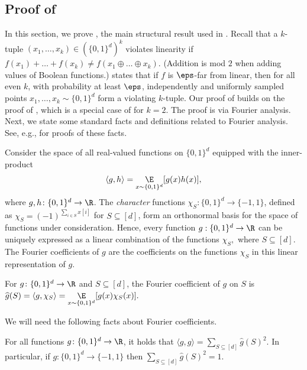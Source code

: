 \documentclass{toc}
\begin{document}
\subsection{Proof of }\label{sec:fourier}

 In this section, we prove , the main structural result used in . Recall that a $k$-tuple $(x_1, \dots, x_k) \in (\{0,1\}^d)^k$ violates linearity if $f(x_1) + \dots + f(x_k) \neq f(x_1 \oplus \dots \oplus x_k)$. (Addition is mod $2$ when adding values of Boolean functions.)  states that if $f$ is $\eps$-far from linear, then for all even $k$, with probability at least $\eps$, independently and uniformly sampled points $x_1, \dots, x_k \sim \{0,1\}^d$ form a violating $k$-tuple. 
Our proof of  
builds on the proof of \cite[Theorem 1.2]{BellareCHKS96}, which is a special case of  for $k=2$. The proof is via Fourier analysis. Next, we state some standard facts and definitions related to Fourier analysis. See, e.g., \cite{OD1} for proofs of these facts. 

Consider the space of all real-valued functions on $\{0,1\}^d$ equipped with the inner-product 
\[\langle g, h \rangle = \underset{x\sim \{0,1\}^d}{\E}[g(x)h(x)],\]
where $g, h \colon \{0,1\}^d \to \R$. The \emph{character} functions $\chi_S \colon \{0, 1\}^d \to \{-1,1\}$, defined as $\chi_S = (-1)^{\sum_{i \in S} x[i]}$ for $S \subseteq [d]$, form an orthonormal basis for the space of functions under consideration. Hence, every function $g:\{0,1\}^d\to\R$ can be uniquely expressed as a linear combination of the functions $\chi_S,$ where $S\subseteq [d]$. The Fourier coefficients of $g$ are the coefficients on the functions  $\chi_S$ in this linear representation of $g$.  

\begin{definition}
For $g \colon \{0,1\}^d \to \R$ and $S \subseteq [d]$, the Fourier coefficient of $g$ on $S$ is 
$
    \widehat{g}(S) = \langle g, \chi_S \rangle = \underset{x\sim \{0,1\}^d}{\E}[g(x)\chi_S(x)].
$
\end{definition}

We will need the following facts about Fourier coefficients. 

\begin{theorem}\label{thm:parseval}
For all functions $g\colon\{0,1\}^d \to \R$, it holds that $ \langle g,g\rangle =  \sum_{S\subseteq [d]} \widehat{g}(S)^2$.
%
%
%
In particular, if $g\colon\{0,1\}^d \to \{-1,1\}$ then $ \sum_{S\subseteq [d]} \widehat{g}(S)^2=1$. 
\end{theorem}
\end{document}
